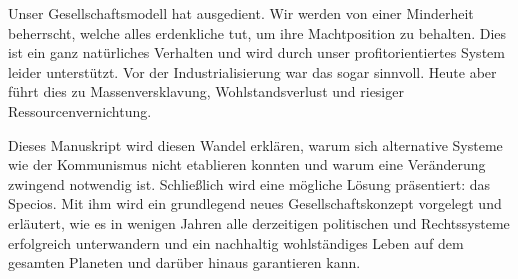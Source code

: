 Unser Gesellschaftsmodell hat ausgedient. Wir werden von einer Minderheit beherrscht, welche alles erdenkliche tut, um ihre Machtposition zu behalten. Dies ist ein ganz natürliches Verhalten und wird durch unser profitorientiertes System leider unterstützt. Vor der Industrialisierung war das sogar sinnvoll. Heute aber führt dies zu Massenversklavung, Wohlstandsverlust und riesiger Ressourcenvernichtung.

Dieses Manuskript wird diesen Wandel erklären, warum sich alternative Systeme wie der Kommunismus nicht etablieren konnten und warum eine Veränderung zwingend notwendig ist. Schließlich wird eine mögliche Lösung präsentiert: das Specios. Mit ihm wird ein grundlegend neues Gesellschaftskonzept vorgelegt und erläutert, wie es in wenigen Jahren alle derzeitigen politischen und Rechtssysteme erfolgreich unterwandern und ein nachhaltig wohlständiges Leben auf dem gesamten Planeten und darüber hinaus garantieren kann.
